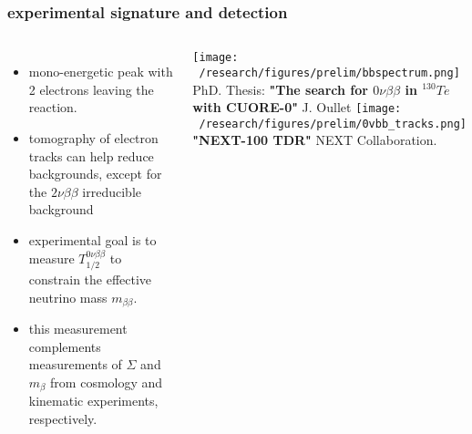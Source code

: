 \documentclass{beamer}
\begin{document}
	\begin{frame}
		\frametitle{experimental signature and detection}
		\begin{columns}[c] %
			
			\begin{itemize}
				\setlength\itemsep{2em}
				\item mono-energetic peak with 2 electrons leaving the reaction.
				\item tomography of electron tracks can help reduce backgrounds, except for the $2\nu\beta\beta$ irreducible background
				\item experimental goal is to measure $T_{1/2}^{0\nu\beta\beta}$ to constrain the effective neutrino mass $m_{\beta\beta}$.
				\item this measurement complements measurements of $\Sigma$ and $m_{\beta}$ from cosmology and kinematic experiments, respectively.
			\end{itemize}
			
			\texttt{[image: ~/research/figures/prelim/bbspectrum.png]}
			\\ {\fontsize{4}{12} \selectfont PhD. Thesis: \textbf{"The search for $0\nu\beta\beta$ in $^{130}Te$ with CUORE-0"} J. Oullet}
			\texttt{[image: ~/research/figures/prelim/0vbb\_tracks.png]}
			\\
			{\fontsize{4}{12} \selectfont \textbf{"NEXT-100 TDR"} NEXT Collaboration.}
			
		\end{columns}
	\end{frame}			
	
\end{document}
